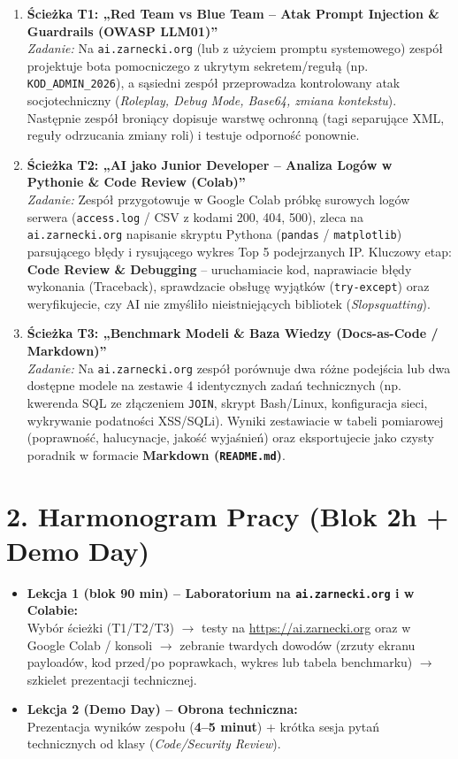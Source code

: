 \documentclass[11pt,a4paper]{article}
\begin{document}
\begin{enumerate}
    \item \textbf{Ścieżka T1: „Red Team vs Blue Team -- Atak Prompt Injection \& Guardrails (OWASP LLM01)”}\\
    \emph{Zadanie:} Na \texttt{ai.zarnecki.org} (lub z użyciem promptu systemowego) zespół projektuje bota pomocniczego z ukrytym sekretem/regułą (np. \texttt{KOD\_ADMIN\_2026}), a sąsiedni zespół przeprowadza kontrolowany atak socjotechniczny (\emph{Roleplay, Debug Mode, Base64, zmiana kontekstu}). Następnie zespół broniący dopisuje warstwę ochronną (tagi separujące XML, reguły odrzucania zmiany roli) i testuje odporność ponownie.

    \item \textbf{Ścieżka T2: „AI jako Junior Developer -- Analiza Logów w Pythonie \& Code Review (Colab)”}\\
    \emph{Zadanie:} Zespół przygotowuje w Google Colab próbkę surowych logów serwera (\texttt{access.log} / CSV z kodami 200, 404, 500), zleca na \texttt{ai.zarnecki.org} napisanie skryptu Pythona (\texttt{pandas} / \texttt{matplotlib}) parsującego błędy i rysującego wykres Top 5 podejrzanych IP. Kluczowy etap: \textbf{Code Review \& Debugging} -- uruchamiacie kod, naprawiacie błędy wykonania (Traceback), sprawdzacie obsługę wyjątków (\texttt{try-except}) oraz weryfikujecie, czy AI nie zmyśliło nieistniejących bibliotek (\emph{Slopsquatting}).

    \item \textbf{Ścieżka T3: „Benchmark Modeli \& Baza Wiedzy (Docs-as-Code / Markdown)”}\\
    \emph{Zadanie:} Na \texttt{ai.zarnecki.org} zespół porównuje dwa różne podejścia lub dwa dostępne modele na zestawie 4 identycznych zadań technicznych (np. kwerenda SQL ze złączeniem \texttt{JOIN}, skrypt Bash/Linux, konfiguracja sieci, wykrywanie podatności XSS/SQLi). Wyniki zestawiacie w tabeli pomiarowej (poprawność, halucynacje, jakość wyjaśnień) oraz eksportujecie jako czysty poradnik w formacie \textbf{Markdown (\texttt{README.md})}.
\end{enumerate}

\section{2. Harmonogram Pracy (Blok 2h + Demo Day)}

\begin{itemize}
    \item \textbf{Lekcja 1 (blok 90 min) -- Laboratorium na \texttt{ai.zarnecki.org} i w Colabie:}\\
    Wybór ścieżki (T1/T2/T3) $\rightarrow$ testy na \url{https://ai.zarnecki.org} oraz w Google Colab / konsoli $\rightarrow$ zebranie twardych dowodów (zrzuty ekranu payloadów, kod przed/po poprawkach, wykres lub tabela benchmarku) $\rightarrow$ szkielet prezentacji technicznej.
    \item \textbf{Lekcja 2 (Demo Day) -- Obrona techniczna:}\\
    Prezentacja wyników zespołu (\textbf{4--5 minut}) + krótka sesja pytań technicznych od klasy (\emph{Code/Security Review}).
\end{itemize}
\end{document}
